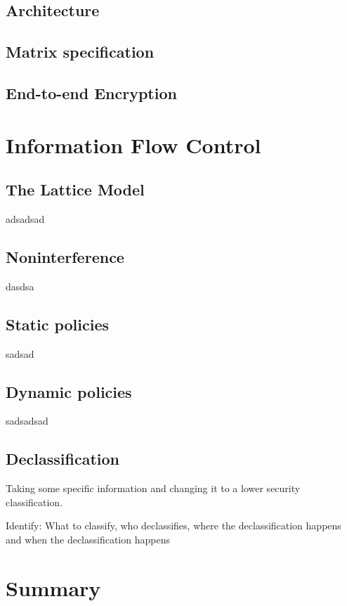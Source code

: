 \subsection{Architecture}

\subsection{Matrix specification}

\subsection{End-to-end Encryption}





\newpage
\section{Information Flow Control} %

\subsection{The Lattice Model}
adsadsad

\subsection{Noninterference}
dasdsa

\subsection{Static policies}


sadsad
\subsection{Dynamic policies}
sadsadsad


\subsection{Declassification}
Taking some specific information and changing it to a lower security classification.

Identify: What to classify, who declassifies, where the declassification happens and when the declassification happens

\section{Summary}

